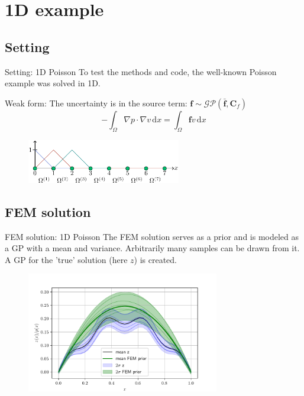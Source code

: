 \documentclass[fleqn,11pt,aspectratio=43]{beamer}
\begin{document}
\section{1D example}
\subsection{Setting}

\begin{frame}{Setting: 1D Poisson}
To test the methods and code, the well-known Poisson example was solved in 1D.
\begin{block}{Weak form:}
The uncertainty is in the source term: $\bm{f} \sim \mathcal{GP}(\bar{\bm{f}}, \bm{C}_f)$
\begin{equation*}
-\int_{\Omega} \nabla p \cdot \nabla v \,\mathrm{d}x = \int_{\Omega} \bm{f}v \,\mathrm{d}x
\end{equation*}
\end{block}
      	\begin{figure}[h]
		\begin{center}
		\includegraphics[width=0.6\textwidth]{1dDomain}
		\end{center}
		\end{figure}

\end{frame}


\subsection{FEM solution}
\begin{frame}{FEM solution: 1D Poisson}
The FEM solution serves as a prior and is modeled as a GP with a mean and variance. Arbitrarily many samples can be drawn from it. A GP for the 'true' solution (here $z$) is created.
      	\begin{figure}[h]
		\begin{center}
		\includegraphics[width=0.75\textwidth]{FEMprior_Z}
		\end{center}
		\end{figure}

\end{frame}
\end{document}
